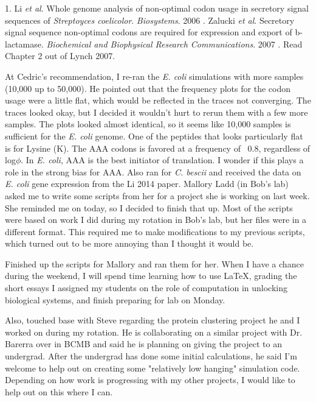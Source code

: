 \documentclass[11pt]{labbook}
\begin{document}
1. Li \textit{et al}.
Whole genome analysis of non-optimal codon usage in secretory signal sequences of \textit{Streptoyces coelicolor}. \textit{Biosystems}. 2006
. Zalucki \textit{et al}. Secretory signal sequence non-optimal codons are required for expression and export of b-lactamase. \textit{Biochemical and Biophysical Research Communications}. 2007
. Read Chapter 2 out of Lynch 2007.
\let\cleardoublepage\clearpage

At Cedric's recommendation, I re-ran the \textit{E. coli} simulations with more samples (10,000 up to 50,000). He pointed out that the frequency plots for the codon usage were a little flat, which would be reflected in the traces not converging. The traces looked okay, but I decided it wouldn't hurt to rerun them with a few more samples. The plots looked almost identical, so it seems like 10,000 samples is sufficient for the \textit{E. coli} genome. One of the peptides that looks particularly flat is for Lysine (K). The AAA codons is favored at a frequency of ~0.8, regardless of log$\phi$. In \textit{E. coli}, AAA is the best initiator of translation. I wonder if this plays a role in the strong bias for AAA.
\newline
Also ran for \textit{C. bescii} and received the data on \textit{E. coli} gene expression from the Li 2014 paper.
\newline
Mallory Ladd (in Bob's lab) asked me to write some scripts from her for a project she is working on last week. She reminded me on today, so I decided to finish that up. Most of the scripts were based on work I did during my rotation in Bob's lab, but her files were in a different format. This required me to make modifications to my previous scripts, which turned out to be more annoying than I thought it would be.

Finished up the scripts for Mallory and ran them for her. When I have a chance during the weekend, I will spend time learning how to use LaTeX, grading the short essays I assigned my students on the role of computation in unlocking biological systems, and finish preparing for lab on Monday.
\newline

Also, touched base with Steve regarding the protein clustering project he and I worked on during my rotation. He is collaborating on a similar project with Dr. Barerra over in BCMB and said he is planning on giving the project to an undergrad. After the undergrad has done some initial calculations, he said I'm welcome to help out on creating some "relatively low hanging" simulation code. Depending on how work is progressing with my other projects, I would like to help out on this where I can. 
\end{document}
